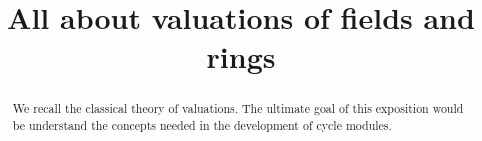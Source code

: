 
\title{All about valuations of fields and rings}

\begin{abstract}
We recall the classical theory of valuations. The ultimate goal 
of this exposition would be understand the concepts needed in the 
development of cycle modules.
\end{abstract}
